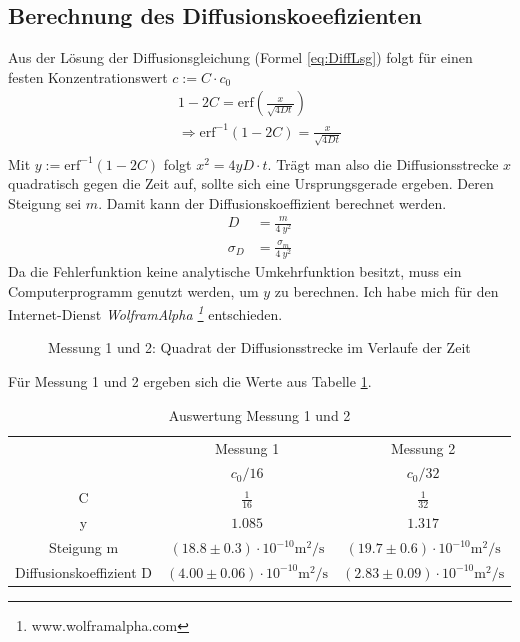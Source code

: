\documentclass[12pt,a4paper,titlepage,headinclude,bibtotoc]{scrartcl}
\newcommand{\erf}{\ensuremath{\text{erf}}}
\begin{document}
\subsection{Berechnung des Diffusionskoeefizienten}
Aus der Lösung der Diffusionsgleichung  (Formel \ref{eq:DiffLsg}) folgt für einen festen Konzentrationswert $c:=C\cdot c_0$
\begin{align*}
	1-2C=\erf\left(\frac{x}{\sqrt{4Dt}}\right)\\
	\Rightarrow \erf^{-1}(1-2C)=\frac{x}{\sqrt{4Dt}}\\
\end{align*}
Mit $y:=\erf^{-1}(1-2C)$ folgt $x^2=4yD\cdot t$.
Trägt man also die Diffusionsstrecke $x$ quadratisch gegen die Zeit auf, sollte sich eine Ursprungsgerade ergeben.
Deren Steigung sei $m$.
Damit kann der Diffusionskoeffizient berechnet werden.
\begin{align}
	D&=\frac{m}{4~y^2}\\
	\sigma_D&=\frac{\sigma_m}{4~y^2}
\end{align}
Da die Fehlerfunktion keine analytische Umkehrfunktion besitzt, muss ein Computerprogramm genutzt werden, um $y$ zu berechnen. Ich habe mich für den Internet-Dienst \textsl{WolframAlpha \footnote{www.wolframalpha.com}} entschieden.

\begin{figure}
	
	\caption{Messung 1 und 2: Quadrat der Diffusionsstrecke im Verlaufe der Zeit}
	\label{fig:mess12}
\end{figure}

Für Messung 1 und 2 ergeben sich die Werte aus Tabelle \ref{tab:ausw12}.
\begin{table}[!htb]
\centering
\begin{tabular}{|c|c|c|}
	\hline		
	& Messung 1 & Messung 2 \\
	& $c_0/16$ & $c_0/32$ \\
	\hline
	\hline
	C & $\frac{1}{16}$ & $\frac{1}{32}$\\
	y & $1.085$ & $1.317$ \\	
	\hline
	Steigung m & 
	$(18.8 \pm 0.3) \cdot 10^{-10}\si{\meter ^2 / \second}$ & 
	$(19.7 \pm 0.6) \cdot 10^{-10} \si{ \meter ^2 / \second}$ \\	
	
	Diffusionskoeffizient D &
	$(4.00 \pm 0.06) \cdot 10^{-10}\si{\meter ^2 / \second}$ & 
	$(2.83 \pm 0.09) \cdot 10^{-10} \si{ \meter ^2 / \second}$ \\	
	\hline		
\end{tabular}
\caption{Auswertung Messung 1 und 2}
\label{tab:ausw12}
\end{table}
\end{document}
